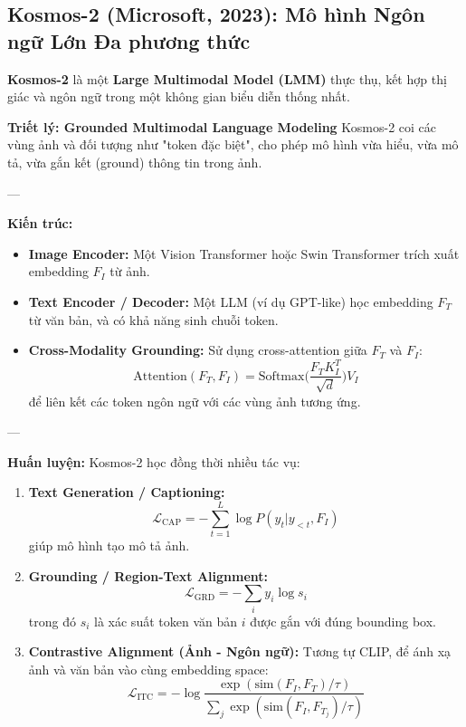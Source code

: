 \subsection{Kosmos-2 (Microsoft, 2023): Mô hình Ngôn ngữ Lớn Đa phương thức}
\label{subsec:kosmos_2}

\textbf{Kosmos-2} \cite{Peng2023_Kosmos2} là một \textbf{Large Multimodal Model (LMM)} thực thụ, kết hợp thị giác và ngôn ngữ trong một không gian biểu diễn thống nhất.

\textbf{Triết lý: Grounded Multimodal Language Modeling}  
Kosmos-2 coi các vùng ảnh và đối tượng như "token đặc biệt", cho phép mô hình vừa hiểu, vừa mô tả, vừa gắn kết (ground) thông tin trong ảnh.

---

\textbf{Kiến trúc:}  
\begin{itemize}
	\item \textbf{Image Encoder:} Một Vision Transformer hoặc Swin Transformer trích xuất embedding $F_I$ từ ảnh.
	\item \textbf{Text Encoder / Decoder:} Một LLM (ví dụ GPT-like) học embedding $F_T$ từ văn bản, và có khả năng sinh chuỗi token.
	\item \textbf{Cross-Modality Grounding:} Sử dụng cross-attention giữa $F_T$ và $F_I$:
	\[
	\text{Attention}(F_T, F_I) = \text{Softmax}\Big(\frac{F_T K_I^T}{\sqrt{d}}\Big)V_I
	\]
	để liên kết các token ngôn ngữ với các vùng ảnh tương ứng.
\end{itemize}

---

\textbf{Huấn luyện:} Kosmos-2 học đồng thời nhiều tác vụ:
\begin{enumerate}
	\item \textbf{Text Generation / Captioning:}
	\[
	\mathcal{L}_\text{CAP} = -\sum_{t=1}^L \log P(y_t | y_{<t}, F_I)
	\]
	giúp mô hình tạo mô tả ảnh.
	
	\item \textbf{Grounding / Region-Text Alignment:} 
	\[
	\mathcal{L}_\text{GRD} = - \sum_i y_i \log s_i
	\]
	trong đó $s_i$ là xác suất token văn bản $i$ được gắn với đúng bounding box.
	
	\item \textbf{Contrastive Alignment (Ảnh - Ngôn ngữ):}  
	Tương tự CLIP, để ánh xạ ảnh và văn bản vào cùng embedding space:
	\[
	\mathcal{L}_\text{ITC} = - \log \frac{\exp(\text{sim}(F_I, F_T)/\tau)}{\sum_j \exp(\text{sim}(F_I, F_{T_j})/\tau)}
	\]
\end{enumerate}

